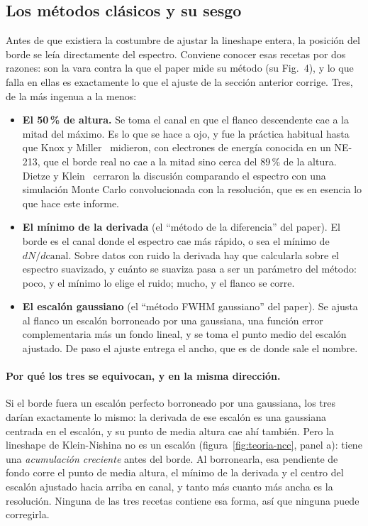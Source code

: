 \documentclass[11pt,a4paper]{article}
\begin{document}
\subsection{Los métodos clásicos y su sesgo}
\label{sec:clasicos}
\adaptado

Antes de que existiera la costumbre de ajustar la lineshape entera, la posición
del borde se leía directamente del espectro. Conviene conocer esas recetas por
dos razones: son la vara contra la que el paper mide su método (su Fig.~4), y
lo que falla en ellas es exactamente lo que el ajuste de la sección
anterior corrige. Tres, de la más ingenua a la menos:

\begin{itemize}
\item \textbf{El 50\,\% de altura.} Se toma el canal en que el flanco
      descendente cae a la mitad del máximo. Es lo que se hace a ojo, y fue
      la práctica habitual hasta que Knox y Miller~\cite{knox1972} midieron,
      con electrones de energía conocida en un NE-213, que el borde real no
      cae a la mitad sino cerca del 89\,\% de la altura. Dietze y
      Klein~\cite{dietze1982} cerraron la discusión comparando el espectro con
      una simulación Monte Carlo convolucionada con la resolución, que es en
      esencia lo que hace este informe.
\item \textbf{El mínimo de la derivada} (el ``método de la diferencia'' del
      paper). El borde es el canal donde el espectro cae más rápido, o sea el
      mínimo de $dN/d\text{canal}$. Sobre datos con ruido la derivada hay que
      calcularla sobre el espectro suavizado, y cuánto se suaviza pasa a ser
      un parámetro del método: poco, y el mínimo lo elige el ruido; mucho, y el
      flanco se corre.
\item \textbf{El escalón gaussiano} (el ``método FWHM gaussiano'' del paper).
      Se ajusta al flanco un escalón borroneado por una gaussiana, una función
      error complementaria más un fondo lineal, y se toma el punto medio del
      escalón ajustado. De paso el ajuste entrega el ancho, que es de donde
      sale el nombre.
\end{itemize}

\paragraph{Por qué los tres se equivocan, y en la misma dirección.} Si el
borde fuera un escalón perfecto borroneado por una gaussiana, los tres darían
exactamente lo mismo: la derivada de ese escalón es una gaussiana centrada en
el escalón, y su punto de media altura cae ahí también. Pero la lineshape de
Klein-Nishina no es un escalón (figura~\ref{fig:teoria-ncc}, panel a): tiene
una \emph{acumulación creciente} antes del borde. Al borronearla, esa pendiente
de fondo corre el punto de media altura, el mínimo de la derivada y el centro
del escalón ajustado hacia arriba en canal, y tanto más cuanto más ancha es la
resolución. Ninguna de las tres recetas contiene esa forma, así que ninguna
puede corregirla.
\end{document}
